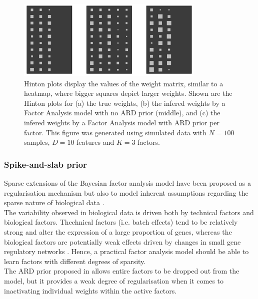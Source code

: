 \begin{figure}[H] \begin{center}
	\includegraphics[width=0.8\textwidth]{Chapter2/Figs/hinton}
            \caption[(Copied from Damien's thesis) Hinton plot of the weight matrix for a Bayesian Factor Analysis model with an ARD prior]{Hinton plots display the values of the weight matrix, similar to a heatmap, where bigger squares depict larger weights. Shown are the Hinton plots for (a) the true weights, (b) the infered weights by a Factor Analysis model with no ARD prior (middle), and (c) the infered weights by a Factor Analysis model with ARD prior per factor. This figure was generated using simulated data with $N=100$ samples, $D=10$ features and $K=3$ factors.}
	\label{fig:hinton}
\end{center} \end{figure}

\subsubsection{Spike-and-slab prior} \label{section_spikeslab}

Sparse extensions of the Bayesian factor analysis model have been proposed as a regularisation mechanism but also to model inherent assumptions regarding the sparse nature of biological data \cite{Stegle2012,Gao2013}.\\
The variability observed in biological data is driven both by technical factors and biological factors. Thechnical factors (i.e. batch effects) tend to be relatively strong and alter the expression of a large proportion of genes, whereas the biological factors are potentially weak effects driven by changes in small gene regulatory networks \cite{Gao2013}. Hence, a practical factor analysis model should be able to learn factors with different degrees of sparsity.\\
The ARD prior proposed in  allows entire factors to be dropped out from the model, but it provides a weak degree of regularisation when it comes to inactivating individual weights within the active factors.

